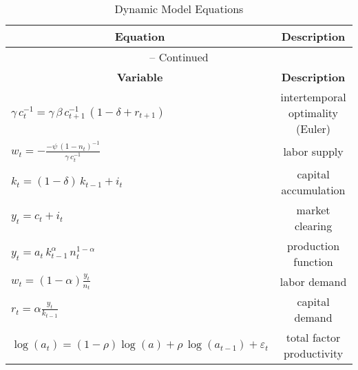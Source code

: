 \begin{center}
\begin{longtable}{lc}
\caption{Dynamic Model Equations\label{tbl:RBC.Model}}\\%
\toprule%
\multicolumn{1}{c}{\textbf{Equation}} &
\multicolumn{1}{c}{\textbf{Description}}\\%
\midrule\midrule%
\endfirsthead%
\multicolumn{2}{c}{{\tablename} \thetable{} {--} Continued}\\%
\midrule%
\multicolumn{1}{c}{\textbf{Variable}} &
\multicolumn{1}{c}{\textbf{Description}}\\%
\midrule\midrule%
\endhead%
\({{\gamma}}\, {{c}}_{t}^{-1}={{\gamma}}\, {{\beta}}\, {{c}}_{t+1}^{-1}\, \left(1-{{\delta}}+{{r}}_{t+1}\right)\) & intertemporal optimality (Euler)
\\
\({{w}}_{t}=-\frac{-{{\psi}}\, {\left(1-{{n}}_{t}\right)}^{-1}}{{{\gamma}}\, {{c}}_{t}^{-1}}\) & labor supply
\\
\({{k}}_{t}=\left(1-{{\delta}}\right)\, {{k}}_{t-1}+{{i}}_{t}\) & capital accumulation
\\
\({{y}}_{t}={{c}}_{t}+{{i}}_{t}\) & market clearing
\\
\({{y}}_{t}={{a}}_{t}\, {{k}}_{t-1}^{{{\alpha}}}\, {{n}}_{t}^{1-{{\alpha}}}\) & production function
\\
\({{w}}_{t}=\left(1-{{\alpha}}\right)\frac{{{y}}_{t}}{{{n}}_{t}}\) & labor demand
\\
\({{r}}_{t}={{\alpha}}\frac{{{y}}_{t}}{{{k}}_{t-1}}\) & capital demand
\\
\(\log\left({{a}}_{t}\right)= (1-\rho) \log{(a)} + {{\rho}}\, \log\left({{a}}_{t-1}\right)+{{\varepsilon}}_{t}\) & total factor productivity
\\
\bottomrule%
\end{longtable}
\end{center}
    
